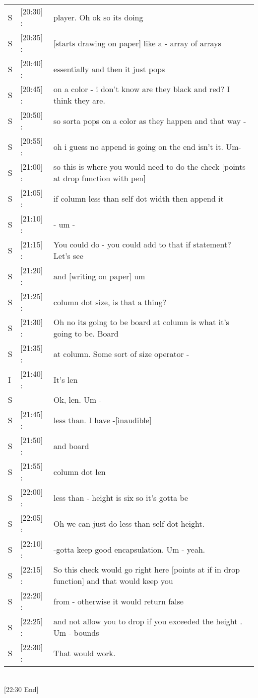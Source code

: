 \begin{tabular}{llp{13cm}}
S&[20:30] :& player. Oh ok so its doing \\
S&[20:35] :& [starts drawing on paper] like a - array of arrays \\
S&[20:40] :& essentially and then it just pops \\
S&[20:45] :& on a color - i don't know are they black and red? I think they are. \\
S&[20:50] :& so sorta pops on a color as they happen and that way - \\
S&[20:55] :& oh i guess no append is going on the end isn't it. Um- \\ 
S&[21:00] :& so this is where you would need to do the check [points at drop function with pen] \\
S&[21:05] :& if column less than self dot width then append it \\
S&[21:10] :& - um  - \\
S&[21:15] :& You could do - you could add to that if statement? Let's see \\
S&[21:20] :& and [writing on paper] um \\
S&[21:25] :& column dot size, is that a thing? \\
S&[21:30] :& Oh no its going to be board at column is what it's going to be. Board \\
S&[21:35] :& at column. Some sort of size operator - \\
I&[21:40] :& It's len \\
S&& Ok, len. Um - \\
S&[21:45] :& less than. I have -[inaudible] \\
S&[21:50] :& and board \\
S&[21:55] :& column dot len \\
S&[22:00] :& less than - height is six so it's gotta be \\
S&[22:05] :& Oh we can just do less than self dot height. \\
S&[22:10] :& -gotta keep good encapsulation. Um - yeah. \\
S&[22:15] :& So this check would go right here [points at if in drop function] and that would keep you \\
S&[22:20] :& from - otherwise it would return false \\
S&[22:25] :& and not allow you to drop if you exceeded the height . Um - bounds \\
S&[22:30] :& That would work. \\
\end{tabular} \\

[22:30 End]

\newpage